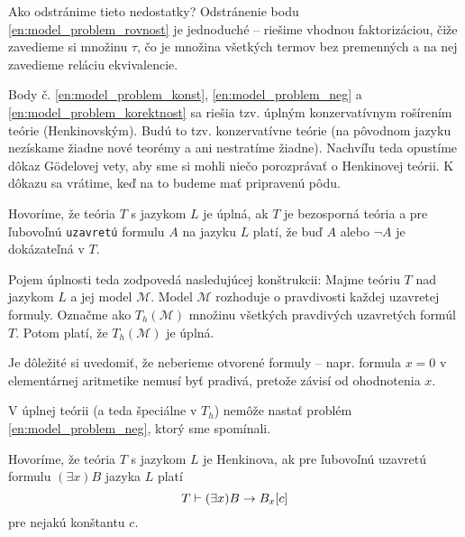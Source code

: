 \begin{dokaz}
    Ako odstránime tieto nedostatky?
    Odstránenie bodu \ref{en:model_problem_rovnost} je jednoduché --
    riešime vhodnou faktorizáciou, čiže zavedieme si množinu $\tau$,
    čo je množina všetkých termov bez premenných
    a na nej zavedieme reláciu ekvivalencie.

    Body č. \ref{en:model_problem_konst}, \ref{en:model_problem_neg} a 
    \ref{en:model_problem_korektnost} sa riešia tzv.
    úplným konzervatívnym rošírením teórie (Henkinovským).
    Budú to tzv.  konzervatívne teórie (na pôvodnom jazyku
    nezískame žiadne nové teorémy a ani nestratíme žiadne).
    Nachvíľu teda opustíme dôkaz G\"odelovej vety, aby sme si mohli niečo
    porozprávať o Henkinovej teórii. K dôkazu sa vrátime, keď na to budeme
    mať pripravenú pôdu.
    \\
\end{dokaz}

\begin{definicia}
    Hovoríme, že teória $T$ s jazykom $L$ je úplná, ak $T$ je
    bezosporná teória a pre ľubovoľnú {\tt uzavretú} formulu $A$ na jazyku
    $L$ platí, že buď $A$ alebo $\neg A$ je dokázateľná v $T$.
\end{definicia}

\begin{poznamka}
    Pojem úplnosti teda zodpovedá nasledujúcej konštrukcii:
    Majme teóriu $T$ nad jazykom $L$ a jej model $\mathcal{M}$.
    Model $\mathcal{M}$ rozhoduje o pravdivosti každej uzavretej
    formuly.
    Označme ako $T_h(\mathcal{M})$ množinu všetkých
    pravdivých uzavretých formúl $T$.
    Potom platí, že $T_h(\mathcal{M})$ je úplná.

    Je dôležité si uvedomiť, že neberieme otvorené formuly --
    napr. formula $x=0$ v elementárnej aritmetike nemusí byť pradivá, 
    pretože závisí od ohodnotenia $x$.
\end{poznamka}

\begin{poznamka}
    V úplnej teórii (a teda špeciálne v $T_h$) nemôže nastať problém 
    \ref{en:model_problem_neg}, ktorý sme spomínali.
\end{poznamka}

\begin{definicia}
    Hovoríme, že teória $T$ s jazykom $L$ je Henkinova, ak pre
    ľubovoľnú uzavretú formulu $(\exists x)B$ jazyka $L$ platí
    \begin{equation*}
        T \vdash (\exists x)B \rightarrow B_x[c]
    \end{equation*}
    pre nejakú konštantu $c$.
\end{definicia}

